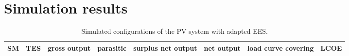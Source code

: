 \chapter{Simulation results} \label{Simulation results}
%

\begin{sidewaystable} 
  \centering
\begin{tabular}{ p{2.0cm} C{2.0cm} C{2.0cm} C{2.0cm} C{2.0cm} C{2.0cm} C{2.0cm} C{2.0cm} } 
	\hline	
\textbf{SM} & \textbf{TES} & \textbf{gross output} & \textbf{parasitic} & \textbf{surplus net output} & \textbf{net output} & \textbf{load curve covering} & \textbf{LCOE} \\ \hline \hline

\end{tabular}
\caption[Simulated configurations of the PV system with adapted EES.]{Simulated configurations of the PV system with adapted EES.}\label{tbl: PV_OverallConfig}
\end{sidewaystable} 



\pagebreak